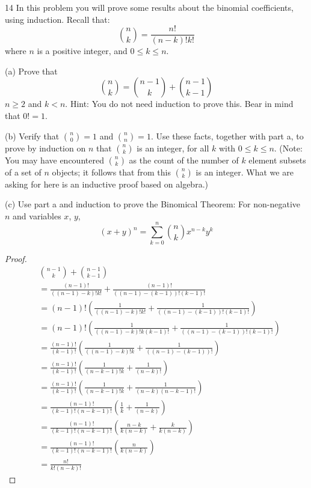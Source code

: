 \begin{problem}{14}
    In this problem you will prove some results about the binomial coefficients, using induction.
    Recall that:
    \[\binom{n}{k} = \frac{n!}{(n - k)!k!}\]
    where $n$ is a positive integer, and $0 \le k \le n$.

    (a) Prove that 
    \[\binom{n}{k} = \binom{n - 1}{k} + \binom{n - 1}{k - 1}\]
    $n \ge 2$ and $k < n$. Hint: You do not need induction to prove this.
    Bear in mind that $0! = 1$.

    (b) Verify that $\binom{n}{0} = 1$ and $\binom{n}{n} = 1$. Use these facts,
    together with part a, to prove by induction on $n$ that $\binom{n}{k}$ is an integer,
    for all $k$ with $0 \le k \le n$. (Note: You may have encountered $\binom{n}{k}$ as the 
    count of the number of $k$ element subsets of a set of $n$ objects; it follows that from this 
    $\binom{n}{k}$ is an integer. What we are asking for here is an inductive proof based on algebra.)

    (c) Use part a and induction to prove the Binomical Theorem: For non-negative $n$ and variables $x$, $y$,
    \[{(x + y)}^n = \sum_{k = 0}^{n} \binom{n}{k}x^{n - k}y^k\]
\end{problem}
\solved

\begin{proof}
    \begin{align*}
         & \binom{n - 1}{k} + \binom{n - 1}{k - 1}                                                             \\
         & = \frac{(n - 1)!}{((n - 1) - k)!k!} + \frac{(n - 1)!}{((n - 1) - (k - 1))!(k - 1)!}                 \\
         & =  (n - 1)!\left(\frac{1}{((n - 1) - k)!k!} + \frac{1}{((n - 1) - (k - 1))!(k - 1)!}\right)         \\
         & =  (n - 1)!\left(\frac{1}{((n - 1) - k)!k(k - 1)!} + \frac{1}{((n - 1) - (k - 1))!(k - 1)!}\right)  \\
         & =  \frac{(n - 1)!}{(k - 1)!}\left(\frac{1}{((n - 1) - k)!k} + \frac{1}{((n - 1) - (k - 1))!}\right) \\
         & =  \frac{(n - 1)!}{(k - 1)!}\left(\frac{1}{(n - k - 1)!k} + \frac{1}{(n - k)!}\right)               \\
         & =  \frac{(n - 1)!}{(k - 1)!}\left(\frac{1}{(n - k - 1)!k} + \frac{1}{(n - k)(n - k - 1)!}\right)    \\
         & =  \frac{(n - 1)!}{(k - 1)!(n - k - 1)!}\left(\frac{1}{k} + \frac{1}{(n - k)}\right)                \\
         & =  \frac{(n - 1)!}{(k - 1)!(n - k - 1)!}\left(\frac{n - k}{k(n - k)} + \frac{k}{k(n - k)}\right)    \\
         & =  \frac{(n - 1)!}{(k - 1)!(n - k - 1)!}\left(\frac{n}{k(n - k)}\right)                             \\
         & =  \frac{n!}{k!(n - k)!}
    \end{align*}
\end{proof}


